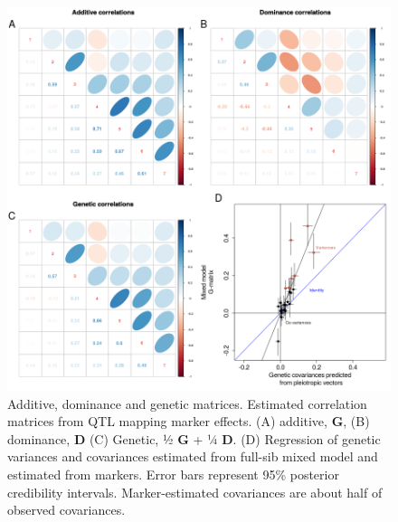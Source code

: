 \begin{refsection}
\begin{figure}
\includegraphics[width=\linewidth]{chapter_JoH-Melo_etal/media/growth_cov_prediction_composite.png}
\caption[Additive, dominance and genetic matrices]{Additive, dominance and genetic matrices. Estimated
correlation matrices from QTL mapping marker effects. (A) additive, \textbf{G}, (B)
dominance, \textbf{D} (C) Genetic, ½ \textbf{G} + ¼ \textbf{D}. (D) Regression of
genetic variances and covariances estimated from full-sib mixed model
and estimated from markers. Error bars represent 95\% posterior
credibility intervals. Marker-estimated covariances are about half of observed
covariances.}
\label{fig:joh:cov}
\end{figure}


\end{refsection}
